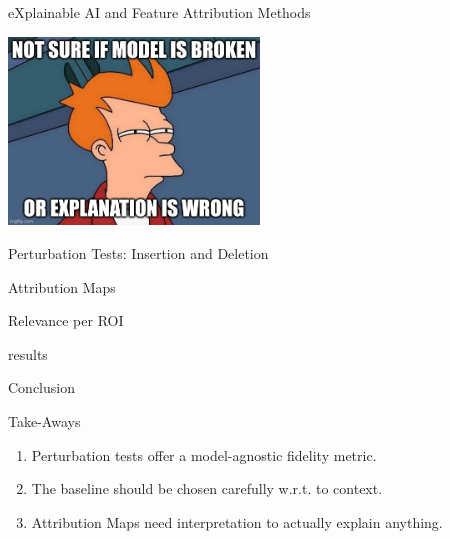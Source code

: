 \documentclass[aspectratio=169]{beamer}
\begin{document}
\begin{frame}{eXplainable AI and Feature Attribution Methods}
\end{frame}

\begin{frame}
	\begin{center}
		\includegraphics[width=0.5\textwidth]{figures/fry-and-xai.jpg}
	\end{center}
\end{frame}

\begin{frame}{Perturbation Tests: Insertion and Deletion}
\end{frame}

\begin{frame}{Attribution Maps}

\end{frame}

\begin{frame}{Relevance per ROI}

\end{frame}

\begin{frame}{results}
\end{frame}

\begin{frame}{Conclusion}
	\begin{block}{Take-Aways}
		\begin{enumerate}
			\item Perturbation tests offer a model-agnostic fidelity metric.
			\item The baseline should be chosen carefully w.r.t. to context.
			\item Attribution Maps need interpretation to actually explain anything.
		\end{enumerate}
	\end{block}
\end{frame}
\end{document}
